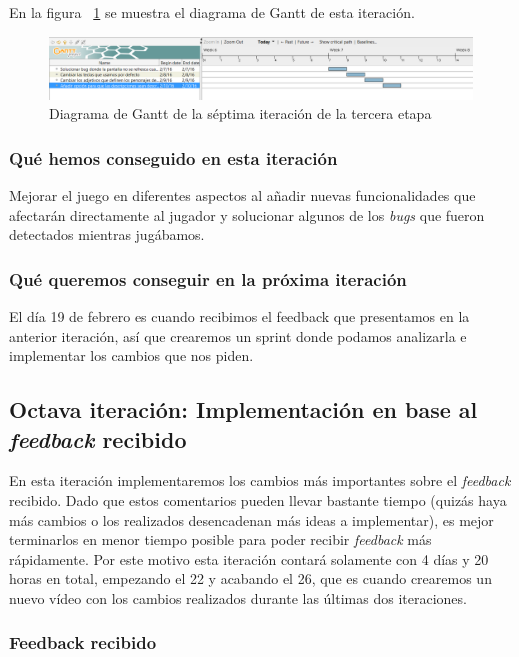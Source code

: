 En la figura ~\ref{fig:sec3it7} se muestra el diagrama de Gantt de esta iteración.

\begin{figure}
    \includegraphics[width=\textwidth,height=\textheight,keepaspectratio]{./img/sec3it7.png}
  \caption{Diagrama de Gantt de la séptima iteración de la tercera etapa}
  \label{fig:sec3it7}
\end{figure}

\subsubsection{Qué hemos conseguido en esta iteración}

Mejorar el juego en diferentes aspectos al añadir nuevas funcionalidades que afectarán directamente al jugador y solucionar algunos de los \textit{bugs} que fueron detectados mientras jugábamos.

\subsubsection{Qué queremos conseguir en la próxima iteración}

El día 19 de febrero es cuando recibimos el feedback que presentamos en la anterior iteración, así que crearemos un sprint donde podamos analizarla e implementar los cambios que nos piden.

\subsection{Octava iteración: Implementación en base al \textit{feedback} recibido}

En esta iteración implementaremos los cambios más importantes sobre el \textit{feedback} recibido. Dado que estos comentarios pueden llevar bastante tiempo (quizás haya más cambios o los realizados desencadenan más ideas a implementar), es mejor terminarlos en menor tiempo posible para poder recibir \textit{feedback} más rápidamente.
Por este motivo esta iteración contará solamente con 4 días y 20 horas en total, empezando el 22 y acabando el 26, que es cuando crearemos un nuevo vídeo con los cambios realizados durante las últimas dos iteraciones.

\subsubsection{Feedback recibido}

